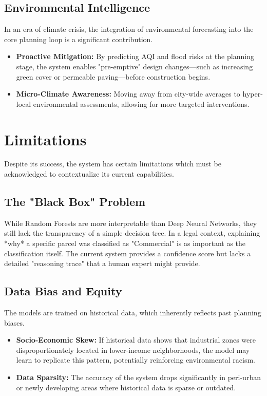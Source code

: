 \documentclass[12pt,a4paper]{report}
\begin{document}
\subsection{Environmental Intelligence}
In an era of climate crisis, the integration of environmental forecasting into the core planning loop is a significant contribution.
\begin{itemize}
    \item \textbf{Proactive Mitigation:} By predicting AQI and flood risks at the planning stage, the system enables "pre-emptive" design changes—such as increasing green cover or permeable paving—before construction begins.
    \item \textbf{Micro-Climate Awareness:} Moving away from city-wide averages to hyper-local environmental assessments, allowing for more targeted interventions.
\end{itemize}

\section{Limitations}
Despite its success, the system has certain limitations which must be acknowledged to contextualize its current capabilities.

\subsection{The "Black Box" Problem}
While Random Forests are more interpretable than Deep Neural Networks, they still lack the transparency of a simple decision tree. In a legal context, explaining *why* a specific parcel was classified as "Commercial" is as important as the classification itself. The current system provides a confidence score but lacks a detailed "reasoning trace" that a human expert might provide.

\subsection{Data Bias and Equity}
The models are trained on historical data, which inherently reflects past planning biases.
\begin{itemize}
    \item \textbf{Socio-Economic Skew:} If historical data shows that industrial zones were disproportionately located in lower-income neighborhoods, the model may learn to replicate this pattern, potentially reinforcing environmental racism.
    \item \textbf{Data Sparsity:} The accuracy of the system drops significantly in peri-urban or newly developing areas where historical data is sparse or outdated.
\end{itemize}
\end{document}
